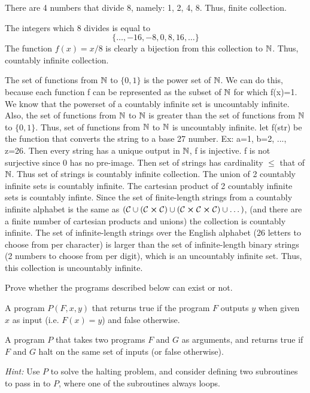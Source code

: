 \documentclass[11pt]{article}
\begin{document}
\begin{solution}\begin{Parts}\Part 
There are 4 numbers that divide 8, namely: 1, 2, 4, 8. Thus, finite collection.

\Part 
The integers which 8 divides is equal to $$\{\dots,-16,-8,0,8,16,\dots\}$$
The function $f(x)=x/8$ is clearly a bijection from this collection to $\mathbb{N}$.
Thus, countably infinite collection.

\Part 
The set of functions from $\mathbb{N}$ to $\{0,1\}$ is the power set of $\mathbb{N}$. 
We can do this, because each function f can be represented as the subset of $\mathbb{N}$ for which f(x)=1.
We know that the powerset of a countably infinite set is uncountably infinite.
Also, the set of functions from $\mathbb{N}$ to $\mathbb{N}$ is greater than the set of functions from $\mathbb{N}$ to $\{0,1\}$.
Thus, set of functions from $\mathbb{N}$ to $\mathbb{N}$ is uncountably infinite.
\Part let f(str) be the function that converts the string to a base 27 number. 
Ex: a=1, b=2, ..., z=26. Then every string has a unique output in $\mathbb{N}$, f is injective. f is not surjective since 0 has no pre-image.
Then set of strings has cardinality $\leq$ that of $\mathbb{N}$. Thus set of strings is countably infinite collection.
\Part The union of 2 countably infinite sets is countably infinite.
The cartesian product of 2 countably infinite sets is countably infinte.
Since the set of finite-length strings from a countably infinite alphabet is the same as $(\mathcal{C}\cup(\mathcal{C}\cross\mathcal{C})\cup(\mathcal{C}\cross\mathcal{C}\cross\mathcal{C})\cup\dots)$,
(and there are a finite number of cartesian products and unions) the collection is countably infinite.
\Part The set of infinite-length strings over the English alphabet (26 letters to choose from per character) is larger than the set of infinite-length binary strings (2 numbers to choose from per digit), which is an uncountably infinite set.
Thus, this collection is uncountably infinite.
\end{Parts}\end{solution}\newpage



Prove whether the programs described below can exist or not.

\begin{Parts}

\Part A program $P(F,x,y)$ that returns true if the program $F$ outputs $y$ when given $x$ as input (i.e. $F(x)=y$) and false otherwise.


\Part A program $P$ that takes two programs $F$ and $G$ as arguments, and returns true if $F$ and $G$ halt on the same set of inputs (or false otherwise).

\textit{Hint:} Use $P$ to solve the halting problem, and consider defining two subroutines to pass in to $P$, where one of the subroutines always loops.

\end{Parts}
\end{document}
